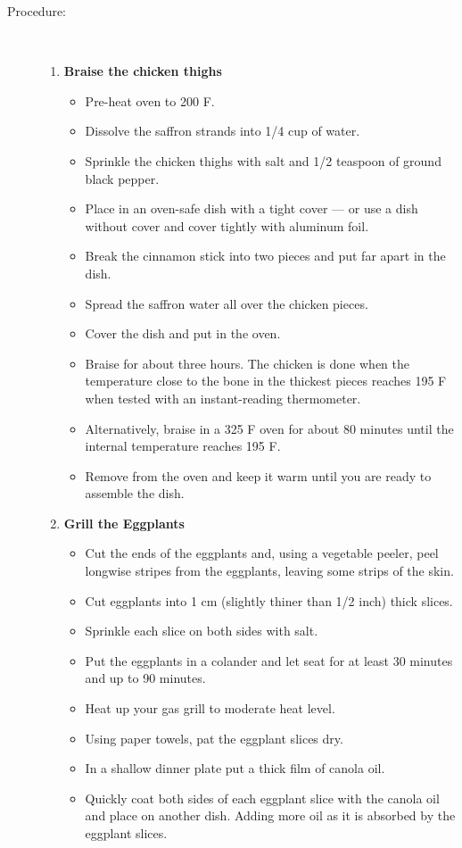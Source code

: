 \documentclass[11pt,letterpaper]{article}
\begin{document}
\begin{description}
\item[Procedure:]\ \\
	\begin{enumerate}
	\item {\bf Braise the chicken thighs}
	\begin{itemize}
	\item Pre-heat oven to 200 F.
	\item Dissolve the saffron strands into 1/4 cup of water.
	\item Sprinkle the chicken thighs with salt and 1/2 teaspoon of ground black pepper.
	\item Place in an oven-safe dish with a tight cover --- or use a dish without cover and cover tightly with aluminum foil.
	\item Break the cinnamon stick into two pieces and put far apart in the dish. 
	\item Spread the saffron water all over the chicken pieces.
	\item Cover the dish and put in the oven.
	\item Braise for about three hours. The chicken is done when the temperature close to the bone in the thickest pieces reaches 195 F when tested with an instant-reading thermometer.
	\item Alternatively, braise in a 325 F oven for about 80 minutes until the internal temperature reaches 195 F.
	\item Remove from the oven and keep it warm until you are ready to assemble the dish. 
	\end{itemize}
	\item {\bf Grill the Eggplants}
	\begin{itemize}
	\item Cut the ends of the eggplants and, using a vegetable peeler, peel longwise stripes from the eggplants, leaving some strips of the skin.
	\item Cut eggplants into 1 cm (slightly thiner than 1/2 inch) thick slices.
	\item Sprinkle each slice on both sides with salt.
	\item Put the eggplants in a colander and let seat for at least 30 minutes and up to 90 minutes.
	\item Heat up your gas grill to moderate heat level.
	\item Using paper towels, pat the eggplant slices dry.
	\item In a shallow dinner plate put a thick film of canola oil.
	\item Quickly coat both sides of each eggplant slice with the canola oil and place on another dish. Adding more oil as it is absorbed by the eggplant slices.

\end{itemize}
\end{enumerate}
\end{description}
\end{document}
